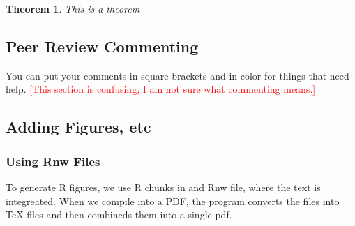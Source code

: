 \documentclass{book}\usepackage{knitr}
\newtheorem{theorem}{Theorem}
\newtheorem{problem}[theorem]{Problem}
\newtheorem{remark}[theorem]{Remark}
\newtheorem{summary}[theorem]{Summary}
\newenvironment{proof}[1][Proof]{\textbf{#1.} }{\ \rule{0.5em}{0.5em}}
\begin{document}




\begin{theorem}
This is a theorem
\end{theorem}




\subsection{Peer Review Commenting}

You can put your comments in square brackets and in color for things that need help. \textcolor{red}{[This section is confusing, I am not sure what commenting means.]}

\subsection{Adding Figures, etc}

\subsubsection{Using Rnw Files}

To generate R figures, we use R chunks in and Rnw file, where the text is integreated. When we compile into a PDF, the program converts the files into TeX files and then combineds them into a single pdf. 
\end{document}

